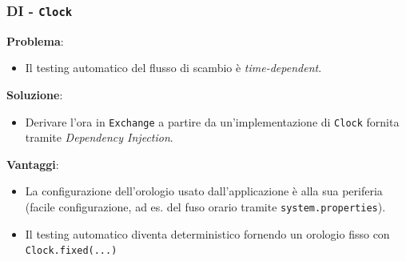 \begin{frame}
    \frametitle{DI - \texttt{Clock}}
    \textbf{Problema}:
    \begin{itemize}
        \item Il testing automatico del flusso di scambio è {\color{red}\emph{time-dependent}}.
    \end{itemize}
    \textbf{Soluzione}:
    \begin{itemize}
        \item Derivare l'ora in \texttt{Exchange} a partire da un'implementazione di \texttt{Clock}
        fornita tramite \emph{Dependency Injection}.
    \end{itemize}
    \textbf{Vantaggi}:
    \begin{itemize}
        \item La configurazione dell'orologio usato dall'applicazione è alla sua periferia
        ({\color{green}facile configurazione}, ad es. del fuso orario tramite \texttt{system.properties}).
        \item {\color{green}Il testing automatico diventa deterministico} fornendo un orologio fisso con \texttt{Clock.fixed(...)}
    \end{itemize}
\end{frame}